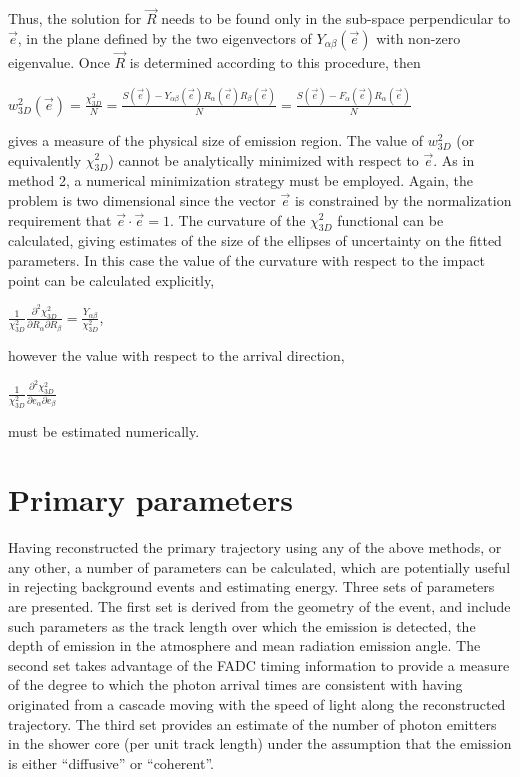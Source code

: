 \documentclass[letterpaper]{article}
\begin{document}
Thus, the solution for $\vec{R}$ needs to be found only in the
sub-space perpendicular to $\vec{e}$, in the plane defined by the two
eigenvectors of $Y_{\alpha\beta}(\vec{e})$ with non-zero
eigenvalue. Once $\vec{R}$ is determined according to this procedure,
then

$\displaystyle w_{3D}^{2}(\vec{e})
=\frac{\chi_{3D}^{2}}{N}=\frac{S(\vec{e})
-Y_{\alpha\beta}(\vec{e})R_{\alpha}(\vec{e})R_{\beta}(\vec{e})}{N}
=\frac{S(\vec{e})-F_{\alpha}(\vec{e})R_{\alpha}(\vec{e})}{N}$

gives a measure of the physical size of emission region. The value of
$w_{3D}^{2}$ (or equivalently $\chi_{3D}^{2}$) cannot be analytically
minimized with respect to $\vec{e}$. As in method 2, a numerical
minimization strategy must be employed. Again, the problem is two
dimensional since the vector $\vec{e}$ is constrained by the
normalization requirement that $\vec{e}\cdot\vec{e}=1$.
The curvature of the $\chi_{3D}^{2}$ functional can be calculated,
giving estimates of the size of the ellipses of uncertainty on the
fitted parameters. In this case the value of the curvature with respect 
to the impact point can be calculated explicitly,

$\displaystyle \frac{1}{\chi_{3D}^2}\frac{\partial^2\chi_{3D}^2}
{\partial R_\alpha\partial R_\beta} = \frac{Y_{\alpha\beta}}{\chi_{3D}^2}$,

however the value with respect to the arrival direction,

$\displaystyle \frac{1}{\chi_{3D}^2}\frac{\partial^2\chi_{3D}^2}
{\partial e_\alpha\partial e_\beta}$

must be estimated numerically.

%
%

\section{Primary parameters}

Having reconstructed the primary trajectory using any of the above
methods, or any other, a number of parameters can be calculated, which
are potentially useful in rejecting background events and estimating
energy. Three sets of parameters are presented. The first set is
derived from the geometry of the event, and include such parameters as
the track length over which the emission is detected, the depth of
emission in the atmosphere and mean radiation emission angle. The
second set takes advantage of the FADC timing information to provide a
measure of the degree to which the photon arrival times are consistent
with having originated from a cascade moving with the speed of light
along the reconstructed trajectory. The third set provides an estimate
of the number of photon emitters in the shower core (per unit track
length) under the assumption that the emission is either ``diffusive''
or ``coherent''.
\end{document}
